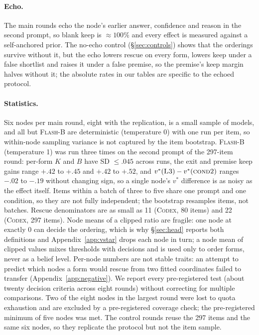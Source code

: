 \documentclass[11pt]{article}
\begin{document}
\paragraph{Echo.} The main rounds echo the node's earlier answer, confidence and reason in the second prompt, so blank keep is $\approx100\%$ and every effect is measured against a self-anchored prior. The no-echo control (\S\ref{sec:controls}) shows that the orderings survive without it, but the echo lowers rescue on every form, lowers keep under a false shortlist and raises it under a false premise, so the premise's keep margin halves without it; the absolute rates in our tables are specific to the echoed protocol.

\paragraph{Statistics.} Six nodes per main round, eight with the replication, is a small sample of models, and all but \textsc{Flash-B} are deterministic (temperature 0) with one run per item, so within-node sampling variance is not captured by the item bootstrap. \textsc{Flash-B} (temperature 1) was run three times on the second prompt of the 297-item round: per-form $K$ and $B$ have SD $\le.045$ across runs, the exit and premise keep gains range $+.42$ to $+.45$ and $+.42$ to $+.52$, and $v^\ast(\textsc{L3})-v^\ast(\textsc{cond2})$ ranges $-.02$ to $-.19$ without changing sign, so a single node's $v^\ast$ difference is as noisy as the effect itself. Items within a batch of three to five share one prompt and one condition, so they are not fully independent; the bootstrap resamples items, not batches. Rescue denominators are as small as 11 (\textsc{Codex}, 80 items) and 22 (\textsc{Codex}, 297 items). Node means of a clipped ratio are fragile: one node at exactly 0 can decide the ordering, which is why \S\ref{sec:head} reports both definitions and Appendix~\ref{app:vstar} drops each node in turn; a node mean of clipped values mixes thresholds with decisions and is used only to order forms, never as a belief level. Per-node numbers are not stable traits: an attempt to predict which nodes a form would rescue from two fitted coordinates failed to transfer (Appendix~\ref{app:negative}). We report every pre-registered test (about twenty decision criteria across eight rounds) without correcting for multiple comparisons. Two of the eight nodes in the largest round were lost to quota exhaustion and are excluded by a pre-registered coverage check; the pre-registered minimum of five nodes was met. The control rounds reuse the 297 items and the same six nodes, so they replicate the protocol but not the item sample.
\end{document}
